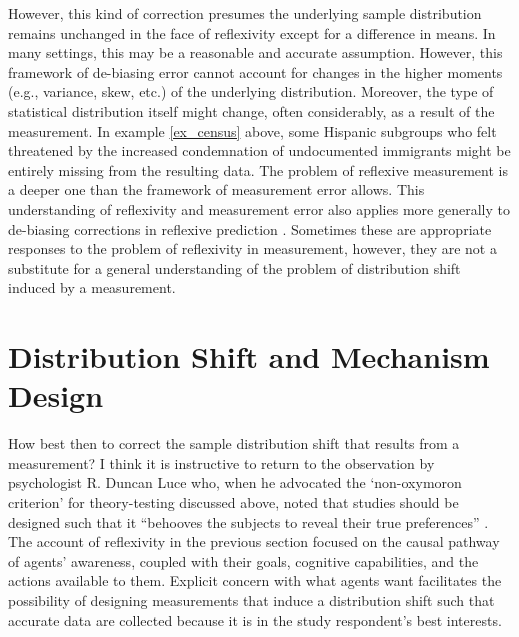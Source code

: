 However, this kind of correction presumes the underlying sample distribution remains unchanged in the face of reflexivity except for a difference in means. In many settings, this may be a reasonable and accurate assumption. However, this framework of de-biasing error cannot account for changes in the higher moments (e.g., variance, skew, etc.) of the underlying distribution. Moreover, the type of statistical distribution itself might change, often considerably, as a result of the measurement. In example \ref{ex_census} above, some Hispanic subgroups who felt threatened by the increased condemnation of undocumented immigrants might be entirely missing from the resulting data. The problem of reflexive measurement is a deeper one than the framework of measurement error allows. This understanding of reflexivity and measurement error also applies more generally to de-biasing corrections in reflexive prediction \autocite{cejka2022}. Sometimes these are appropriate responses to the problem of reflexivity in measurement, however, they are not a substitute for a general understanding of the problem of distribution shift induced by a measurement.

\section{Distribution Shift and Mechanism Design}\label{sec_reflex_mechdes}

How best then to correct the sample distribution shift that results from a measurement? I think it is instructive to return to the observation by psychologist R. Duncan Luce who, when he advocated the `non-oxymoron criterion' for theory-testing discussed above, noted that studies should be designed such that it ``behooves the subjects to reveal their true preferences'' \autocite[p9]{luce95}. The account of reflexivity in the previous section focused on the causal pathway of agents' awareness, coupled with their goals, cognitive capabilities, and the actions available to them. Explicit concern with what agents want facilitates the possibility of designing measurements that induce a distribution shift such that accurate data are collected because it is in the study respondent's best interests.

